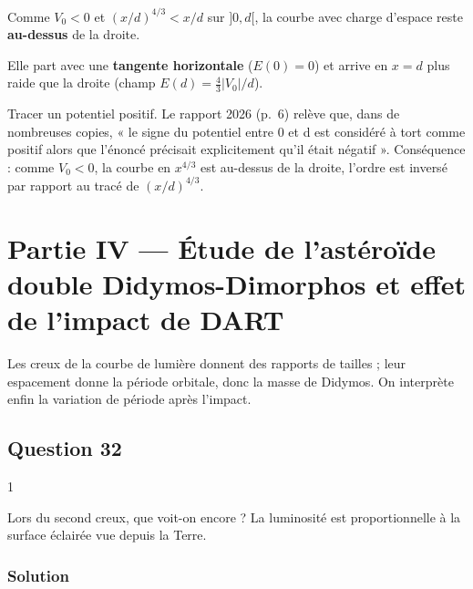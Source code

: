 \documentclass[11pt,a4paper]{article}
\begin{document}
Comme \(V_0<0\) et \((x/d)^{4/3}<x/d\) sur \(]0,d[\), la courbe avec charge d'espace reste \textbf{au-dessus} de la droite.

Elle part avec une \textbf{tangente horizontale} (\(E(0)=0\)) et arrive en \(x=d\) plus raide que la droite (champ \(E(d)=\frac43|V_0|/d\)).

\begin{piege}

Tracer un potentiel positif. Le rapport 2026 (p.~6) relève que, dans de nombreuses copies, « le signe du potentiel entre 0 et d est considéré à tort comme positif alors que l'énoncé précisait explicitement qu'il était négatif ». Conséquence : comme \(V_0<0\), la courbe en \(x^{4/3}\) est au-dessus de la droite, l'ordre est inversé par rapport au tracé de \((x/d)^{4/3}\).

\end{piege}

\hypertarget{partie-iv-uxe9tude-de-lastuxe9rouxefde-double-didymos-dimorphos-et-effet-de-limpact-de-dart}{%
\section{Partie IV --- Étude de l'astéroïde double Didymos-Dimorphos et effet de l'impact de DART}\label{partie-iv-uxe9tude-de-lastuxe9rouxefde-double-didymos-dimorphos-et-effet-de-limpact-de-dart}}

Les creux de la courbe de lumière donnent des rapports de tailles ; leur espacement donne la période orbitale, donc la masse de Didymos. On interprète enfin la variation de période après l'impact.

\hypertarget{question-32}{%
\subsection{Question 32}\label{question-32}}

\begin{indication}{1}

Lors du second creux, que voit-on encore ? La luminosité est proportionnelle à la surface éclairée vue depuis la Terre.

\end{indication}

\hypertarget{solution-31}{%
\subsubsection{Solution}\label{solution-31}}
\end{document}
